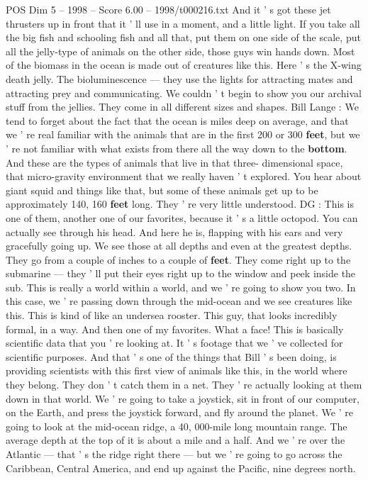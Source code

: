 \begin{textsample}{POS Dim 5 – 1998 – Score 6.00 – 1998/t000216.txt}
And it ' s got these jet thrusters up in front that it ' ll use in a moment, and a little light.
If you take all the big fish and schooling fish and all that, put them on one side of the scale, put all the jelly-type of animals on the other side, those guys win hands down.
Most of the biomass in the ocean is made out of creatures like this.
Here ' s the X-wing death jelly.
The bioluminescence — they use the lights for attracting mates and attracting prey and communicating.
We couldn ' t begin to show you our archival stuff from the jellies.
They come in all different sizes and shapes.
Bill Lange : We tend to forget about the fact that the ocean is miles deep on average, and that we ' re real familiar with the animals that are in the first 200 or 300 \textbf{feet}, but we ' re not familiar with what exists from there all the way down to the \textbf{bottom}.
And these are the types of animals that live in that three- dimensional space, that micro-gravity environment that we really haven ' t explored.
You hear about giant squid and things like that, but some of these animals get up to be approximately 140, 160 \textbf{feet} long.
They ' re very little understood.
DG : This is one of them, another one of our favorites, because it ' s a little octopod.
You can actually see through his head.
And here he is, flapping with his ears and very gracefully going up.
We see those at all depths and even at the greatest depths.
They go from a couple of inches to a couple of \textbf{feet}.
They come right up to the submarine — they ' ll put their eyes right up to the window and peek inside the sub.
This is really a world within a world, and we ' re going to show you two.
In this case, we ' re passing down through the mid-ocean and we see creatures like this.
This is kind of like an undersea rooster.
This guy, that looks incredibly formal, in a way.
And then one of my favorites.
What a face!
This is basically scientific data that you ' re looking at.
It ' s footage that we ' ve collected for scientific purposes.
And that ' s one of the things that Bill ' s been doing, is providing scientists with this first view of animals like this, in the world where they belong.
They don ' t catch them in a net.
They ' re actually looking at them down in that world.
We ' re going to take a joystick, sit in front of our computer, on the Earth, and press the joystick forward, and fly around the planet.
We ' re going to look at the mid-ocean ridge, a 40, 000-mile long mountain range.
The average depth at the top of it is about a mile and a half.
And we ' re over the Atlantic — that ' s the ridge right there — but we ' re going to go across the Caribbean, Central America, and end up against the Pacific, nine degrees north.

\end{textsample}
